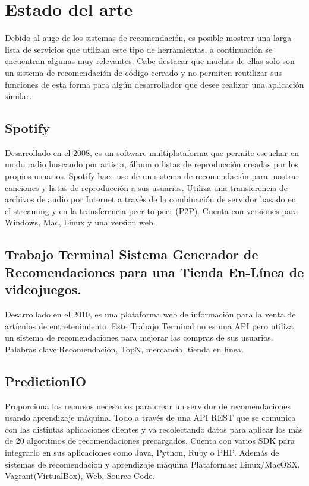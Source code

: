 \chapter {Estado del arte}
  Debido al auge de los sistemas de recomendación, es posible mostrar una larga lista de servicios que utilizan este tipo de herramientas, a continuación se encuentran algunas muy relevantes. Cabe destacar que muchas de ellas solo son un sistema de recomendación de código cerrado y no permiten reutilizar sus funciones de esta forma para algún desarrollador que desee realizar una aplicación similar.

  \section {Spotify}
    Desarrollado en el 2008, es un software multiplataforma que permite escuchar en modo radio buscando por artista, álbum o listas de reproducción creadas por los propios usuarios. Spotify hace uso de un sistema de recomendación para mostrar canciones y listas de reproducción a sus usuarios. Utiliza una transferencia de archivos de audio por Internet a través de la combinación de servidor basado en el streaming y en la transferencia peer-to-peer (P2P). Cuenta con versiones para Windows, Mac, Linux y una versión web. \cite{4}

  \section{Trabajo Terminal Sistema Generador de Recomendaciones para una Tienda En-Línea de videojuegos.} 
    Desarrollado en el 2010, es una plataforma web de información para la venta de artículos de entretenimiento. Este Trabajo Terminal no es una API pero utiliza un sistema de recomendaciones para mejorar las compras de sus usuarios. Palabras clave:Recomendación, TopN, mercancía, tienda en línea.\cite{5}

  \section{PredictionIO}
    Proporciona los recursos necesarios para crear un servidor de recomendaciones usando aprendizaje máquina. Todo a través de una API REST que se comunica con las distintas aplicaciones clientes y va recolectando datos para aplicar los más de 20 algoritmos de recomendaciones precargados. Cuenta con varios SDK para integrarlo en sus aplicaciones como Java, Python, Ruby o PHP. Además de sistemas de recomendación y aprendizaje máquina Plataformas: Linux/MacOSX, Vagrant(VirtualBox), Web, Source Code.\cite{6}


